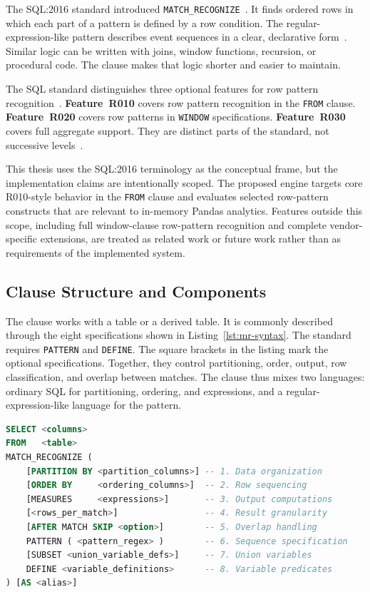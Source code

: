 The SQL:2016 standard introduced
\texttt{MATCH\_RECOGNIZE}~\cite{ISO2016SQL,iso2016}.  It finds ordered
rows in which each part of a pattern is defined by a row condition.
The regular-expression-like pattern describes event sequences in a
clear, declarative form~\cite{winand2017sqlnew}.  Similar logic can be
written with joins, window functions, recursion, or procedural code.
The clause makes that logic shorter and easier to maintain.

The SQL standard distinguishes three optional features for row pattern
recognition~\cite{winand_match_recognize}.  \textbf{Feature~R010}
covers row pattern recognition in the \texttt{FROM} clause.
\textbf{Feature~R020} covers row patterns in \texttt{WINDOW}
specifications.  \textbf{Feature~R030} covers full aggregate support.
They are distinct parts of the standard, not successive
levels~\cite{ISO2021,michels2018new,melton2017sqlrpr}.

This thesis uses the SQL:2016 terminology as the conceptual frame,
but the implementation claims are intentionally scoped.  The proposed
engine targets core R010-style behavior in the \texttt{FROM} clause
and evaluates selected row-pattern constructs that are relevant to
in-memory Pandas analytics.  Features outside this scope, including
full window-clause row-pattern recognition and complete vendor-specific
extensions, are treated as related work or future work rather than as
requirements of the implemented system.


\subsection{Clause Structure and Components}
\label{subsec:bg-clause-structure}
The clause works with a table or a derived table.  It is commonly
described through the eight specifications shown in
Listing~\ref{lst:mr-syntax}.  The standard requires \texttt{PATTERN}
and \texttt{DEFINE}.  The square brackets in the listing mark the
optional specifications.  Together, they control partitioning, order,
output, row classification, and overlap between matches.  The clause
thus mixes two languages: ordinary SQL for partitioning, ordering, and
expressions, and a regular-expression-like language for the pattern.

\begin{lstlisting}[float=htbp,
    language     = SQL,
    caption      = {General clause structure used in this thesis},
    label        = {lst:mr-syntax}
]
SELECT <columns>
FROM   <table>
MATCH_RECOGNIZE (
    [PARTITION BY <partition_columns>] -- 1. Data organization
    [ORDER BY     <ordering_columns>]  -- 2. Row sequencing
    [MEASURES     <expressions>]       -- 3. Output computations
    [<rows_per_match>]                 -- 4. Result granularity
    [AFTER MATCH SKIP <option>]        -- 5. Overlap handling
    PATTERN ( <pattern_regex> )        -- 6. Sequence specification
    [SUBSET <union_variable_defs>]     -- 7. Union variables
    DEFINE <variable_definitions>      -- 8. Variable predicates
) [AS <alias>]
\end{lstlisting}

